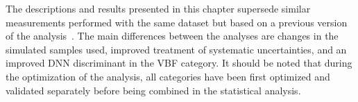 The descriptions and results presented in this chapter supersede similar measurements performed with the same dataset but based on a previous version of the analysis~\cite{ATLAS-CONF-2021-014}.
The main differences between the analyses are changes in the simulated samples used, improved treatment of systematic uncertainties, and an improved DNN discriminant in the VBF category. 
It should be noted that during the optimization of the analysis, all categories have been first optimized and validated separately before being combined in the statistical analysis.


